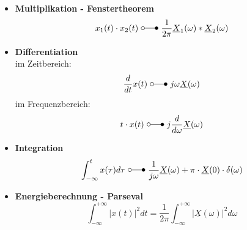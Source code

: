 \begin{mdframed}[style=exercise,nobreak=false]
\begin{itemize}
\[        \]
    \item \textbf{Multiplikation - Fenstertheorem}
        \[
            x_{1}(t) \cdot x_{2}(t)\ \laplace\ \frac{1}{2 \pi} \underline{X}_{1}(\omega) * \underline{X}_{2}(\omega)
        \]
    \item \textbf{Differentiation\\}
        {\small im Zeitbereich:}
        \[
            \frac{d}{dt} x(t) \ \laplace\ j\omega\underline{X}(\omega)
        \]
        {\small im Frequenzbereich:}
        \[
            t \cdot x(t)\ \laplace\ j \frac{d}{d \omega} \underline{X}(\omega)
        \]
    \item \textbf{Integration}
        \[
            \int_{-\infty}^{t} x(\tau) d \tau\ \laplace\ \frac{1}{j \omega} \underline{X}(\omega)+\pi \cdot \underline{X}(0) \cdot \delta(\omega)
        \]
    \item \textbf{Energieberechnung - Parseval}
        \[
            \int_{-\infty}^{+\infty}|x(t)|^{2} d t=\frac{1}{2 \pi} \int_{-\infty}^{+\infty}|\underline{X}(\omega)|^{2} d \omega
        \]
\end{itemize}
\end{mdframed}
